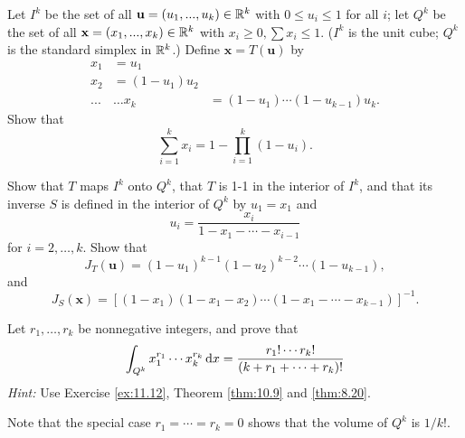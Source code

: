\begin{myexercise}    
    \label{ex:10.12}
    Let $I^k$ be the set of all $\mathbf{u} = (u_1, ... , u_k) \in {\protect\mathbb R}^k$ with $0 \leq u_i \leq 1$ for all $i$; 
    let $Q^k$ be the set of all $\mathbf{x} = (x_1, ... , x_k) \in  {\protect\mathbb R}^k$ with $x_i \geq 0, \sum x_i \leq 1$. 
    ($I^k$ is the unit cube; 
    $Q^k$ is the standard simplex in ${\protect\mathbb R}^k$.) 
    Define $\mathbf{x} = T(\mathbf{u})$ by
    \begin{align*}
        x_1 &= u_1 \\
        x_2 &= (1-u_1)u_2 \\
        ... & \dots
        x_k &= (1-u_1)\cdots(1-u_{k-1})u_k. 
    \end{align*}
    Show that 
    \begin{equation*}
        \sum_{i=1}^{k} x_i = 1 - \prod_{i=1}^{k} (1-u_i) .
    \end{equation*}

    Show that $T$ maps $I^k$ onto $Q^k$, 
    that $T$ is 1-1 in the interior of $I^k$, 
    and that its inverse $S$ is defined in the interior of $Q^k$ by $u_1 = x_1$ and
    \begin{equation*}
        u_i = \frac{x_i}{1-x_1-\cdots-x_{i-1}}
    \end{equation*}
    for $i=2,\dots,k$.
    Show that 
    \begin{equation*}
        J_T(\mathbf{u}) = 
        (1-u_1)^{k-1}
        (1-u_2)^{k-2}
        \cdots 
        (1-u_{k-1}),
    \end{equation*}
    and 
    \begin{equation*}
        J_S(\mathbf{x}) = 
        \left[ 
            (1-x_1)
            (1-x_1-x_2)
            \cdots
            (1-x_1-\cdots-x_{k-1})
         \right]^{-1} .
    \end{equation*}
\end{myexercise}


\begin{myexercise}    
    \label{ex:10.13}
    Let $r_1,\dots,r_k$ be nonnegative integers, and prove that
    \begin{equation*}
        \int_{Q^k} 
        x_1^{r_1} 
        \cdots 
        x_k^{r_k}
        \d x = 
        \frac{r_1!\cdots r_k!}{(k+r_1+\cdots+r_k)!}
    \end{equation*}
    \emph{Hint:} Use Exercise \ref{ex:11.12}, Theorem \ref{thm:10.9} and \ref{thm:8.20}.

    Note that the special case $r_1 = \cdots = r_k = 0$ 
    shows that the volume of $Q^k$ is $1/k!$.
\end{myexercise}


